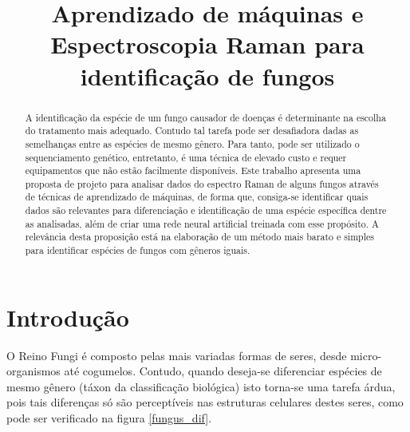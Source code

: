 \documentclass[conference,peerreview]{IEEEtran}
\begin{document}
\title{Aprendizado de máquinas e Espectroscopia Raman para identificação de fungos}


\author{
} %


\ifCLASSOPTIONpeerreview
	\setcounter{page}{1}
	\IEEEpeerreviewmaketitle
\else
	\maketitle
\fi


\begin{abstract}
A identificação da espécie de um fungo causador de doenças é determinante na escolha do tratamento mais adequado. Contudo tal tarefa pode ser desafiadora dadas as semelhanças entre as espécies de mesmo gênero. Para tanto, pode ser utilizado o sequenciamento genético, entretanto, é uma técnica de elevado custo e requer equipamentos que não estão facilmente disponíveis. Este trabalho apresenta uma proposta de projeto para analisar dados do espectro Raman de alguns fungos através de técnicas de aprendizado de máquinas, de forma que, consiga-se identificar quais dados são relevantes para diferenciação e identificação de uma espécie específica dentre as analisadas, além de criar uma rede neural artificial treinada com esse propósito. A relevância desta proposição está na elaboração de um método mais barato e simples para identificar espécies de fungos com gêneros iguais. 
\end{abstract}

\section{Introdução}
O Reino Fungi é composto pelas mais variadas formas de seres, desde micro-organismos até cogumelos. Contudo, quando deseja-se diferenciar espécies de mesmo gênero (táxon da classificação biológica) isto torna-se uma tarefa árdua, pois tais diferenças só são perceptíveis nas estruturas celulares destes seres, como pode ser verificado na figura \ref{fungus_dif}.
\end{document}

